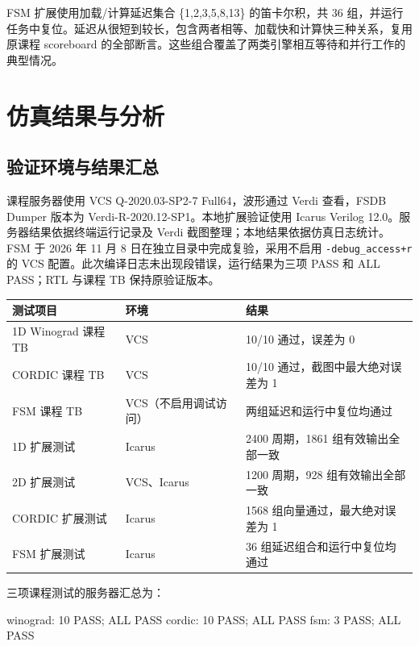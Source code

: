 \documentclass[
  10pt,
  a4paper,
]{article}
\newenvironment{Shaded}{}{}
\newcommand{\NormalTok}[1]{#1}
\begin{document}
FSM 扩展使用加载/计算延迟集合 \{1,2,3,5,8,13\} 的笛卡尔积，共 36
组，并运行任务中复位。延迟从很短到较长，包含两者相等、加载快和计算快三种关系，复用原课程
scoreboard
的全部断言。这些组合覆盖了两类引擎相互等待和并行工作的典型情况。

\section{仿真结果与分析}\label{ux4effux771fux7ed3ux679cux4e0eux5206ux6790}

\subsection{验证环境与结果汇总}\label{ux9a8cux8bc1ux73afux5883ux4e0eux7ed3ux679cux6c47ux603b}

课程服务器使用 VCS Q-2020.03-SP2-7 Full64，波形通过 Verdi 查看，FSDB
Dumper 版本为 Verdi-R-2020.12-SP1。本地扩展验证使用 Icarus Verilog
12.0。服务器结果依据终端运行记录及 Verdi
截图整理；本地结果依据仿真日志统计。FSM 于 2026 年 11 月 8
日在独立目录中完成复验，采用不启用 \texttt{-debug\_access+r} 的 VCS
配置。此次编译日志未出现段错误，运行结果为三项 PASS 和 ALL PASS；RTL
与课程 TB 保持原验证版本。

\begin{longtable}[]{@{}lll@{}}
\toprule\noalign{}
测试项目 & 环境 & 结果 \\
\midrule\noalign{}
\endhead
\bottomrule\noalign{}
\endlastfoot
1D Winograd 课程 TB & VCS & 10/10 通过，误差为 0 \\
CORDIC 课程 TB & VCS & 10/10 通过，截图中最大绝对误差为 1 \\
FSM 课程 TB & VCS（不启用调试访问） & 两组延迟和运行中复位均通过 \\
1D 扩展测试 & Icarus & 2400 周期，1861 组有效输出全部一致 \\
2D 扩展测试 & VCS、Icarus & 1200 周期，928 组有效输出全部一致 \\
CORDIC 扩展测试 & Icarus & 1568 组向量通过，最大绝对误差为 1 \\
FSM 扩展测试 & Icarus & 36 组延迟组合和运行中复位均通过 \\
\end{longtable}

三项课程测试的服务器汇总为：

\begin{Shaded}
\begin{Highlighting}[]
\NormalTok{winograd: 10 PASS; ALL PASS}
\NormalTok{cordic: 10 PASS; ALL PASS}
\NormalTok{fsm: 3 PASS; ALL PASS}
\end{Highlighting}
\end{Shaded}
\end{document}
